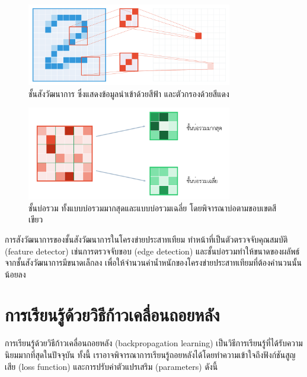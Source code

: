 \documentclass{cpereport}
\begin{document}
\begin{figure}
    \centering
    \includegraphics[width=0.8\textwidth]{images/convolution.pdf}
    \caption{ชั้นสังวัฒนาการ ซึ่งแสดงข้อมูลนำเข้าด้วยสีฟ้า และตัวกรองด้วยสีแดง}
    \label{conv-figure}
\end{figure}
\begin{figure}
    \centering
    \includegraphics[width=0.8\textwidth]{images/pool.pdf}
    \caption{ชั้นบ่อรวม ทั้งแบบบ่อรวมมากสุดและแบบบ่อรวมเฉลี่ย โดยพิจารณาบ่อตามขอบเขตสีเขียว}
    \label{pool-figure}
\end{figure}
การสังวัฒนาการของชั้นสังวัฒนาการในโครงข่ายประสาทเทียม ทำหน้าที่เป็นตัวตรวจจับคุณสมบัติ (feature detector) เช่นการตรวจจับขอบ (edge detection) และชั้นบ่อรวมทำให้ขนาดของผลัพธ์จากชั้นสังวัฒนาการมีขนาดเล็กลง เพื่อให้จำนวนค่าน้ำหนักของโครงข่ายประสาทเทียมที่ต้องคำนวนนั้นน้อยลง

\section{การเรียนรู้ด้วยวิธีก้าวเคลื่อนถอยหลัง}

การเรียนรู้ด้วยวิธีก้าวเคลื่อนถอยหลัง (backpropagation learning) เป็นวิธีการเรียนรู้ที่ได้รับความนิยมมากที่สุดในปัจจุบัน ทั้งนี้ เราอาจพิจารณาการเรียนรู้ถอยหลังได้โดยทำความเข้าใจถึงฟังก์ชันสูญเสีย (loss function) และการปรับค่าตัวแปรเสริม (parameters) ดังนี้
\end{document}
